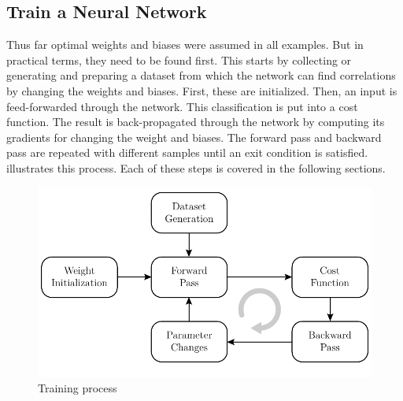 \subsection{Train a Neural Network}
\label{sec:neural-networks-training}
Thus far optimal weights and biases were assumed in all examples.
But in practical terms, they need to be found first.
This starts by collecting or generating and preparing a dataset from which the network can find correlations by changing the weights and biases.
First, these are initialized.
Then, an input is feed-forwarded through the network.
This classification is put into a cost function.
The result is back-propagated through the network by computing its gradients for changing the weight and biases.
The forward pass and backward pass are repeated with different samples until an exit condition is satisfied.
 illustrates this process.
Each of these steps is covered in the following sections.
\begin{figure}
	\centering
	\includegraphics{images/training.pdf}
	\caption[Training process]{Training process}
	\label{fig:training}
\end{figure}





